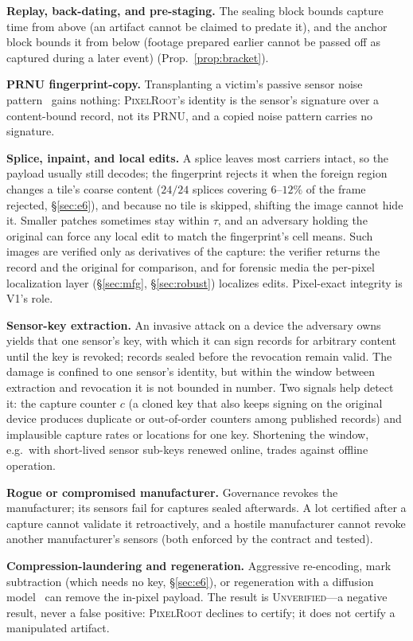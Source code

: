 \documentclass[journal]{IEEEtran}
\newcommand{\pr}{\textup{\textsc{PixelRoot}}}
\begin{document}
\textbf{Replay, back-dating, and pre-staging.} The sealing block bounds capture
time from above (an artifact cannot be claimed to predate it), and the anchor
block bounds it from below (footage prepared earlier cannot be passed off as
captured during a later event) (Prop.~\ref{prop:bracket}).

\textbf{PRNU fingerprint-copy.} Transplanting a victim's passive sensor noise
pattern~\cite{goljan2011defending} gains nothing: \pr{}'s identity is the
sensor's signature over a content-bound record, not its PRNU, and a copied
noise pattern carries no signature.

\textbf{Splice, inpaint, and local edits.} A splice leaves most carriers intact,
so the payload usually still decodes; the fingerprint rejects it when the foreign
region changes a tile's coarse content ($24/24$ splices covering $6$--$12\%$ of
the frame rejected, \S\ref{sec:e6}), and because no tile is skipped, shifting
the image cannot hide it. Smaller patches sometimes stay within $\tau$, and an
adversary holding the original can force any local edit to match the
fingerprint's cell means. Such images are verified only as derivatives of the
capture: the verifier returns the record and the original for comparison, and
for forensic media the per-pixel localization layer (\S\ref{sec:mfg},
\S\ref{sec:robust}) localizes edits. Pixel-exact integrity is V1's role.

\textbf{Sensor-key extraction.} An invasive attack on a device the adversary
owns yields that one sensor's key, with which it can sign records for arbitrary
content until the key is revoked; records sealed before the revocation remain
valid. The damage is confined to one sensor's identity, but within the window
between extraction and revocation it is not bounded in number. Two signals help
detect it: the capture counter $c$ (a cloned key that also keeps signing on the
original device produces duplicate or out-of-order counters among published
records) and implausible capture rates or locations for one key. Shortening
the window, e.g.\ with short-lived sensor sub-keys renewed online, trades
against offline operation.

\textbf{Rogue or compromised manufacturer.} Governance revokes the manufacturer;
its sensors fail for captures sealed afterwards. A lot certified after a capture
cannot validate it retroactively, and a hostile manufacturer cannot revoke
another manufacturer's sensors (both enforced by the contract and tested).

\textbf{Compression-laundering and regeneration.} Aggressive re-encoding,
mark subtraction (which needs no key, \S\ref{sec:e6}), or regeneration with a
diffusion model~\cite{zhao2024invisible} can remove the in-pixel payload. The
result is \textsc{Unverified}---a negative result, never a false positive: \pr{}
declines to certify; it does not certify a manipulated artifact.
\end{document}
